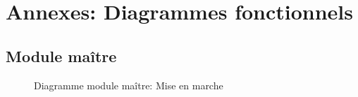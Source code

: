 \section{Annexes: Diagrammes fonctionnels}

	\subsection{Module maître}

		\begin{figure}[H]
			\centering
			\caption{Diagramme module maître: Mise en marche}
			\label{fig:diagrammefonctionnelmiseenmarche}
		\end{figure}

